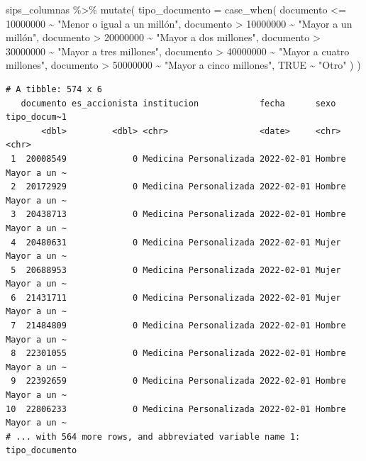 \documentclass[
  letterpaper,
  DIV=11,
  numbers=noendperiod]{scrreprt}
\newenvironment{Shaded}{\begin{snugshade}}{\end{snugshade}}
\newcommand{\AttributeTok}[1]{\textcolor[rgb]{0.40,0.45,0.13}{#1}}
\newcommand{\ConstantTok}[1]{\textcolor[rgb]{0.56,0.35,0.01}{#1}}
\newcommand{\DecValTok}[1]{\textcolor[rgb]{0.68,0.00,0.00}{#1}}
\newcommand{\FunctionTok}[1]{\textcolor[rgb]{0.28,0.35,0.67}{#1}}
\newcommand{\NormalTok}[1]{\textcolor[rgb]{0.00,0.23,0.31}{#1}}
\newcommand{\SpecialCharTok}[1]{\textcolor[rgb]{0.37,0.37,0.37}{#1}}
\newcommand{\StringTok}[1]{\textcolor[rgb]{0.13,0.47,0.30}{#1}}
\begin{document}
\begin{Shaded}
\begin{Highlighting}[]
\NormalTok{sips\_columnas }\SpecialCharTok{\%\textgreater{}\%} \FunctionTok{mutate}\NormalTok{(}
  \AttributeTok{tipo\_documento =} \FunctionTok{case\_when}\NormalTok{(}
\NormalTok{    documento }\SpecialCharTok{\textless{}=} \DecValTok{10000000} \SpecialCharTok{\textasciitilde{}} \StringTok{"Menor o igual a un millón"}\NormalTok{,}
\NormalTok{    documento }\SpecialCharTok{\textgreater{}} \DecValTok{10000000} \SpecialCharTok{\textasciitilde{}} \StringTok{"Mayor a un millón"}\NormalTok{,}
\NormalTok{    documento }\SpecialCharTok{\textgreater{}} \DecValTok{20000000} \SpecialCharTok{\textasciitilde{}} \StringTok{"Mayor a dos millones"}\NormalTok{,}
\NormalTok{    documento }\SpecialCharTok{\textgreater{}} \DecValTok{30000000} \SpecialCharTok{\textasciitilde{}} \StringTok{"Mayor a tres millones"}\NormalTok{,}
\NormalTok{    documento }\SpecialCharTok{\textgreater{}} \DecValTok{40000000} \SpecialCharTok{\textasciitilde{}} \StringTok{"Mayor a cuatro millones"}\NormalTok{,}
\NormalTok{    documento }\SpecialCharTok{\textgreater{}} \DecValTok{50000000} \SpecialCharTok{\textasciitilde{}} \StringTok{"Mayor a cinco millones"}\NormalTok{,}
    \ConstantTok{TRUE} \SpecialCharTok{\textasciitilde{}} \StringTok{"Otro"}
\NormalTok{  )}
\NormalTok{)}
\end{Highlighting}
\end{Shaded}

\begin{verbatim}
# A tibble: 574 x 6
   documento es_accionista institucion            fecha      sexo   tipo_docum~1
       <dbl>         <dbl> <chr>                  <date>     <chr>  <chr>       
 1  20008549             0 Medicina Personalizada 2022-02-01 Hombre Mayor a un ~
 2  20172929             0 Medicina Personalizada 2022-02-01 Hombre Mayor a un ~
 3  20438713             0 Medicina Personalizada 2022-02-01 Hombre Mayor a un ~
 4  20480631             0 Medicina Personalizada 2022-02-01 Mujer  Mayor a un ~
 5  20688953             0 Medicina Personalizada 2022-02-01 Mujer  Mayor a un ~
 6  21431711             0 Medicina Personalizada 2022-02-01 Mujer  Mayor a un ~
 7  21484809             0 Medicina Personalizada 2022-02-01 Hombre Mayor a un ~
 8  22301055             0 Medicina Personalizada 2022-02-01 Hombre Mayor a un ~
 9  22392659             0 Medicina Personalizada 2022-02-01 Hombre Mayor a un ~
10  22806233             0 Medicina Personalizada 2022-02-01 Hombre Mayor a un ~
# ... with 564 more rows, and abbreviated variable name 1: tipo_documento
\end{verbatim}
\end{document}

